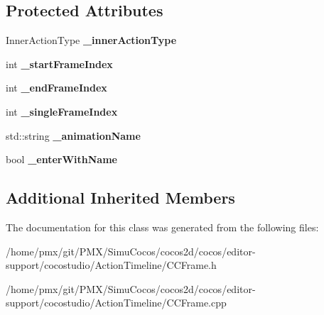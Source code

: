 \subsection*{Protected Attributes}
\begin{DoxyCompactItemize}
\item 
\mbox{\label{classInnerActionFrame_a9179fcdf350ebce07856837e14d9508c}} 
Inner\+Action\+Type {\bfseries \+\_\+inner\+Action\+Type}
\item 
\mbox{\label{classInnerActionFrame_a9171662c61583fddb192a721ea16074c}} 
int {\bfseries \+\_\+start\+Frame\+Index}
\item 
\mbox{\label{classInnerActionFrame_a2061afed2e7b4237993e1f3a2a27d4cc}} 
int {\bfseries \+\_\+end\+Frame\+Index}
\item 
\mbox{\label{classInnerActionFrame_ade07a1b6b487489e88936d62aa9402f0}} 
int {\bfseries \+\_\+single\+Frame\+Index}
\item 
\mbox{\label{classInnerActionFrame_abcd9a10b8c4ecf35e83a6499d038d357}} 
std\+::string {\bfseries \+\_\+animation\+Name}
\item 
\mbox{\label{classInnerActionFrame_a58b224298890a95f646a4ba2967fe77c}} 
bool {\bfseries \+\_\+enter\+With\+Name}
\end{DoxyCompactItemize}
\subsection*{Additional Inherited Members}


The documentation for this class was generated from the following files\+:\begin{DoxyCompactItemize}
\item 
/home/pmx/git/\+P\+M\+X/\+Simu\+Cocos/cocos2d/cocos/editor-\/support/cocostudio/\+Action\+Timeline/C\+C\+Frame.\+h\item 
/home/pmx/git/\+P\+M\+X/\+Simu\+Cocos/cocos2d/cocos/editor-\/support/cocostudio/\+Action\+Timeline/C\+C\+Frame.\+cpp\end{DoxyCompactItemize}
